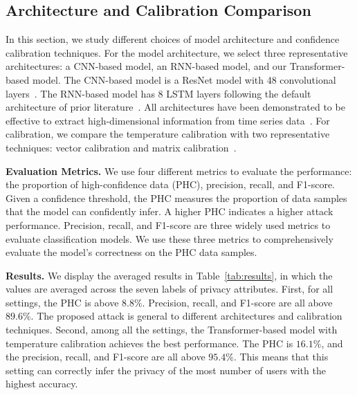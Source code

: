 \subsection{Architecture and Calibration Comparison}

\label{sec:architecture_comparison}

In this section, we study different choices of model architecture and confidence
calibration techniques. For the model architecture, we select three
representative architectures: a CNN-based model, an RNN-based model, and our
Transformer-based model. The CNN-based model is a ResNet model with 48
convolutional layers~\cite{lecun1995convolutional, he2016deep}. The RNN-based
model has 8 LSTM layers following the default architecture of prior
literature~\cite{salehinejad2017recent, hochreiter1997long}. All
architectures have been demonstrated to be effective to extract high-dimensional
information from time series
data~\cite{zerveas2021transformer,hong2020holmes,ma2021effectiveness,ding2019modeling}.
For calibration, we compare the temperature calibration with two
representative techniques: vector calibration and matrix
calibration~\cite{pmlr-v70-guo17a}. 



\noindent \textbf{Evaluation Metrics.}
We use four different metrics to evaluate the performance: the proportion of high-confidence data (PHC), precision,
recall, and F1-score. 
% 
Given a confidence threshold, the PHC measures the proportion of data samples that
the model can confidently infer. A higher PHC indicates a higher attack performance.
% 
Precision, recall, and F1-score are three widely used metrics to evaluate classification models. We use these three metrics to
comprehensively evaluate the model's correctness on the PHC data samples.


\noindent \textbf{Results.}
We display the averaged results in Table~\ref{tab:results}, in which the values are
averaged across the seven labels of privacy attributes.
% 
First, for all settings, the PHC is above $8.8\%$. Precision, recall, and F1-score
are all above $89.6\%$. The
proposed attack is general to different architectures
and calibration techniques. 
% 
Second, among all the settings, the Transformer-based model with temperature
calibration achieves the best performance. The PHC is $16.1\%$, and the
precision, recall, and F1-score are all above $95.4\%$. This means that this setting can
correctly infer the privacy of the most number of users with the highest
accuracy. 



